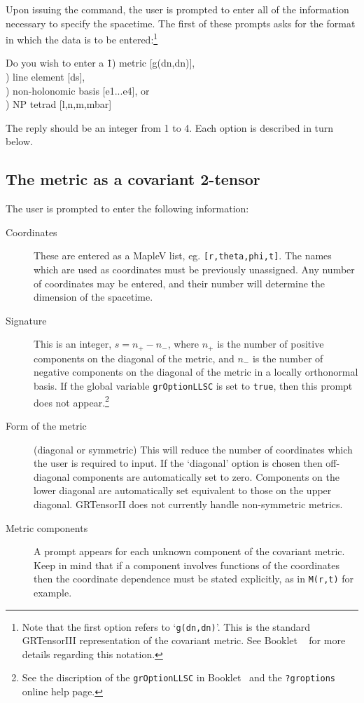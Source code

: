 \documentclass{article}
\begin{document}
Upon issuing the  command, the user is prompted to
enter all of the information necessary to specify the spacetime.
The first of these prompts asks for the format in
which the data is to be entered:\footnote{Note 
that the first option refers to `\texttt{g(dn,dn)}'. This is the standard
GRTensorIII representation of the covariant metric. See Booklet \grCalcRef~
for more details regarding this notation.}
\begin{ttfamily}
  \begin{tabbing}
    Do you wish to enter a \= 1) metric [g(dn,dn)], \\
                           ) line element [ds], \\
                           ) non-holonomic basis [e1...e4], or \\
                           ) NP tetrad [l,n,m,mbar]
  \end{tabbing}
\end{ttfamily}
The reply should be an integer from 1 to 4. Each option is described in turn
below.
%
\subsection{The metric as a covariant 2-tensor} \label{sec:metricentry}
%
The user is prompted to enter the following information:
\begin{description}
  \item[Coordinates] These are entered as a MapleV list,
    eg. \texttt{[r,theta,phi,t]}. The names which are used as coordinates
    must be previously unassigned. Any number of coordinates may be entered,
    and their number will determine the dimension of the spacetime.
  \item[Signature] This is an integer, $s = n_+ - n_-$, where $n_+$ is
    the number of positive components on the diagonal of the metric, and
    $n_-$ is the number of negative components on the diagonal of the
    metric in a locally orthonormal basis. If the global variable
    \texttt{grOptionLLSC} is set to \texttt{true}, then this prompt does
    not appear.\footnote{See the discription of the \texttt{grOptionLLSC}
    in Booklet \grSetupRef~and the \texttt{?groptions} online help page.}
  \item[Form of the metric] (diagonal or symmetric) This will reduce the
    number of coordinates which the user is required to input. If the
    `diagonal' option is chosen then off-diagonal components are automatically
    set to zero. Components on the lower diagonal are automatically
    set equivalent to those on the upper diagonal.  GRTensorII
    does not currently handle non-symmetric metrics.
  \item[Metric components] A prompt appears for each unknown component of
    the covariant metric. Keep in mind that if a component involves functions
    of the coordinates then the coordinate dependence must be stated
    explicitly, as in \texttt{M(r,t)} for example.
\end{description}
%
\end{document}
